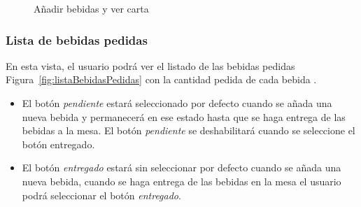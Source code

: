 \begin{figure}[h]
 \centering
    \hfill
 
 \caption{Añadir bebidas y ver carta}
\label{fig:AñadirBebidasYVerCarta}
\end{figure}



\subsubsection*{Lista de bebidas pedidas}
 En esta vista, el usuario podrá ver el listado de las bebidas pedidas Figura~\ref{fig:listaBebidasPedidas} con la cantidad pedida de cada bebida .
 
 \begin{itemize} 

\item El botón \textit{pendiente} estará seleccionado por defecto cuando se añada una nueva bebida y permanecerá en ese estado hasta que se haga entrega de las bebidas a la mesa. El botón \textit{pendiente} se deshabilitará cuando se seleccione el botón entregado.

\item El botón \textit{entregado} estará sin seleccionar por defecto cuando se añada una nueva bebida, cuando se haga entrega de las bebidas en la mesa el usuario podrá seleccionar el botón \textit{entregado}.
\end{itemize}

